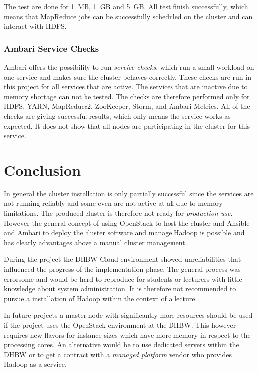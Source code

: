 The test are done for 1~\ac{MB}, 1~\ac{GB} and 5~\ac{GB}.
All test finish successfully, which means that MapReduce jobs can be successfully scheduled on the cluster and can interact with \ac{HDFS}.

\subsubsection{Ambari Service Checks}

Ambari offers the possibility to run \emph{service checks}, which run a small workload on one service and makes sure the cluster behaves correctly.
These checks are run in this project for all services that are active.
The services that are inactive due to memory shortage can not be tested.
The checks are therefore performed  only for \ac{HDFS}, \ac{YARN}, MapReduce2, ZooKeeper, Storm, and Ambari Metrics. All of the checks are giving successful results, which only means the service works as expected. It does not show that all nodes are participating in the cluster for this service. 

\section{Conclusion}

In general the cluster installation is only partially successful since the services are not running reliably and some even are not active at all due to memory limitations.
The produced cluster is therefore not ready for \emph{production use}.
However the general concept of using OpenStack to host the cluster and Ansible and Ambari to deploy the cluster software and manage Hadoop is possible and has clearly advantages above a manual cluster management.

During the project the \ac{DHBW} Cloud environment showed unreliabilities that influenced the progress of the implementation phase.
The general process was errorsome and would be hard to reproduce for students or lecturers with little knowledge about system administration. It is therefore not recommended to pursue a installation of Hadoop within the context of a lecture. 

In future projects a master node with significantly more resources should be used 
if the project uses the OpenStack environment at the \ac{DHBW}.
This however requires new flavors for instance sizes which have more memory in respect to the processing cores.
An alternative would be to use dedicated servers within the \ac{DHBW} or to 
get a contract with a \emph{managed platform} vendor who provides Hadoop as a service.




















